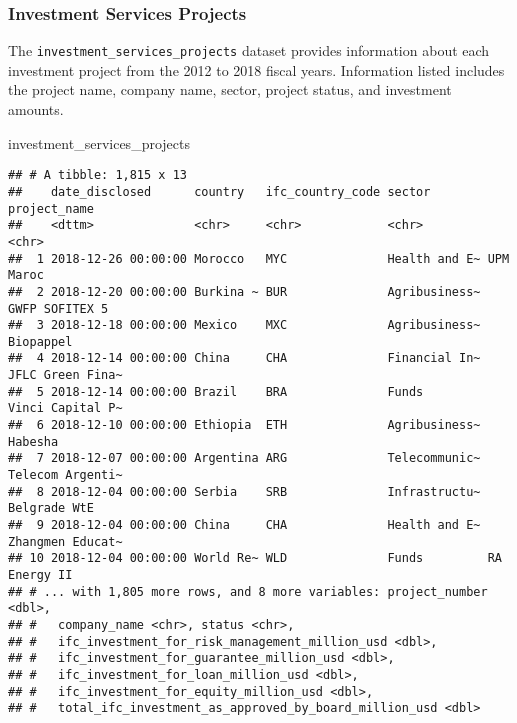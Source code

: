 \documentclass[
]{article}
\newenvironment{Shaded}{\begin{snugshade}}{\end{snugshade}}
\newcommand{\NormalTok}[1]{#1}
\begin{document}
\hypertarget{investment-services-projects}{%
\subsubsection{Investment Services
Projects}\label{investment-services-projects}}

The \texttt{investment\_services\_projects} dataset provides information
about each investment project from the 2012 to 2018 fiscal years.
Information listed includes the project name, company name, sector,
project status, and investment amounts.

\begin{Shaded}
\begin{Highlighting}[]
\NormalTok{investment\_services\_projects }
\end{Highlighting}
\end{Shaded}

\begin{verbatim}
## # A tibble: 1,815 x 13
##    date_disclosed      country   ifc_country_code sector        project_name    
##    <dttm>              <chr>     <chr>            <chr>         <chr>           
##  1 2018-12-26 00:00:00 Morocco   MYC              Health and E~ UPM Maroc       
##  2 2018-12-20 00:00:00 Burkina ~ BUR              Agribusiness~ GWFP SOFITEX 5  
##  3 2018-12-18 00:00:00 Mexico    MXC              Agribusiness~ Biopappel       
##  4 2018-12-14 00:00:00 China     CHA              Financial In~ JFLC Green Fina~
##  5 2018-12-14 00:00:00 Brazil    BRA              Funds         Vinci Capital P~
##  6 2018-12-10 00:00:00 Ethiopia  ETH              Agribusiness~ Habesha         
##  7 2018-12-07 00:00:00 Argentina ARG              Telecommunic~ Telecom Argenti~
##  8 2018-12-04 00:00:00 Serbia    SRB              Infrastructu~ Belgrade WtE    
##  9 2018-12-04 00:00:00 China     CHA              Health and E~ Zhangmen Educat~
## 10 2018-12-04 00:00:00 World Re~ WLD              Funds         RA Energy II    
## # ... with 1,805 more rows, and 8 more variables: project_number <dbl>,
## #   company_name <chr>, status <chr>,
## #   ifc_investment_for_risk_management_million_usd <dbl>,
## #   ifc_investment_for_guarantee_million_usd <dbl>,
## #   ifc_investment_for_loan_million_usd <dbl>,
## #   ifc_investment_for_equity_million_usd <dbl>,
## #   total_ifc_investment_as_approved_by_board_million_usd <dbl>
\end{verbatim}
\end{document}
